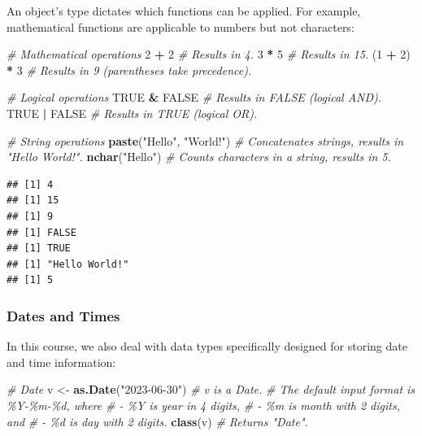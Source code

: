\documentclass[
]{book}
\newenvironment{Shaded}{\begin{snugshade}}{\end{snugshade}}
\newcommand{\CommentTok}[1]{\textcolor[rgb]{0.56,0.35,0.01}{\textit{#1}}}
\newcommand{\ConstantTok}[1]{\textcolor[rgb]{0.56,0.35,0.01}{#1}}
\newcommand{\DecValTok}[1]{\textcolor[rgb]{0.00,0.00,0.81}{#1}}
\newcommand{\FunctionTok}[1]{\textcolor[rgb]{0.13,0.29,0.53}{\textbf{#1}}}
\newcommand{\NormalTok}[1]{#1}
\newcommand{\OtherTok}[1]{\textcolor[rgb]{0.56,0.35,0.01}{#1}}
\newcommand{\SpecialCharTok}[1]{\textcolor[rgb]{0.81,0.36,0.00}{\textbf{#1}}}
\newcommand{\StringTok}[1]{\textcolor[rgb]{0.31,0.60,0.02}{#1}}
\begin{document}
An object's type dictates which functions can be applied. For example, mathematical functions are applicable to numbers but not characters:

\begin{Shaded}
\begin{Highlighting}[]
\CommentTok{\# Mathematical operations}
\DecValTok{2} \SpecialCharTok{+} \DecValTok{2}  \CommentTok{\# Results in 4.}
\DecValTok{3} \SpecialCharTok{*} \DecValTok{5}  \CommentTok{\# Results in 15.}
\NormalTok{(}\DecValTok{1} \SpecialCharTok{+} \DecValTok{2}\NormalTok{) }\SpecialCharTok{*} \DecValTok{3}  \CommentTok{\# Results in 9 (parentheses take precedence).}

\CommentTok{\# Logical operations}
\ConstantTok{TRUE} \SpecialCharTok{\&} \ConstantTok{FALSE}  \CommentTok{\# Results in FALSE (logical AND).}
\ConstantTok{TRUE} \SpecialCharTok{|} \ConstantTok{FALSE}  \CommentTok{\# Results in TRUE (logical OR).}

\CommentTok{\# String operations}
\FunctionTok{paste}\NormalTok{(}\StringTok{"Hello"}\NormalTok{, }\StringTok{"World!"}\NormalTok{)  }\CommentTok{\# Concatenates strings, results in "Hello World!".}
\FunctionTok{nchar}\NormalTok{(}\StringTok{"Hello"}\NormalTok{)  }\CommentTok{\# Counts characters in a string, results in 5.}
\end{Highlighting}
\end{Shaded}

\begin{verbatim}
## [1] 4
## [1] 15
## [1] 9
## [1] FALSE
## [1] TRUE
## [1] "Hello World!"
## [1] 5
\end{verbatim}

\hypertarget{dates-and-times}{%
\subsubsection*{Dates and Times}\label{dates-and-times}}

In this course, we also deal with data types specifically designed for storing date and time information:

\begin{Shaded}
\begin{Highlighting}[]
\CommentTok{\# Date}
\NormalTok{v }\OtherTok{\textless{}{-}} \FunctionTok{as.Date}\NormalTok{(}\StringTok{"2023{-}06{-}30"}\NormalTok{)  }\CommentTok{\# v is a Date.}
\CommentTok{\# The default input format is \%Y{-}\%m{-}\%d, where}
\CommentTok{\# {-} \%Y is year in 4 digits,}
\CommentTok{\# {-} \%m is month with 2 digits, and }
\CommentTok{\# {-} \%d is day with 2 digits.}
\FunctionTok{class}\NormalTok{(v)  }\CommentTok{\# Returns "Date".}
\end{Highlighting}
\end{Shaded}
\end{document}
